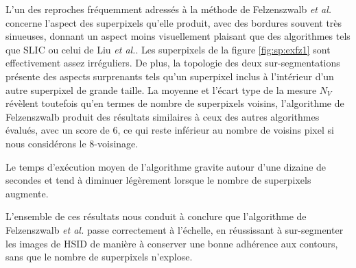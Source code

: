  L'un des reproches fréquemment adressés à la méthode de Felzenszwalb \textit{et al.} concerne l'aspect des superpixels qu'elle produit, avec des bordures souvent très sinueuses, donnant un aspect moins visuellement plaisant que des algorithmes tels que SLIC ou celui de Liu \textit{et al.}. Les superpixels de la figure \ref{fig:sp:exfz1} sont effectivement assez irréguliers. De plus, la topologie des deux sur-segmentations présente des aspects surprenants tels qu'un superpixel inclus à l'intérieur d'un autre superpixel de grande taille. La  moyenne et l'écart type de la mesure $N_{V}$ révèlent toutefois qu'en termes de nombre de superpixels voisins, l'algorithme de Felzenszwalb produit des résultats similaires à ceux des autres algorithmes évalués, avec un score de $6$, ce qui reste inférieur au nombre de voisins  pixel si nous considérons le 8-voisinage.

Le  temps d'exécution moyen de l'algorithme gravite autour d'une dizaine de secondes et tend à diminuer légèrement lorsque le nombre de superpixels augmente. 

L'ensemble de ces résultats nous conduit à conclure que l'algorithme de Felzenszwalb \textit{et al.} passe correctement à l'échelle, en réussissant à sur-segmenter les images de HSID de manière à conserver une bonne adhérence aux contours, sans que le nombre de superpixels n'explose. 
 
